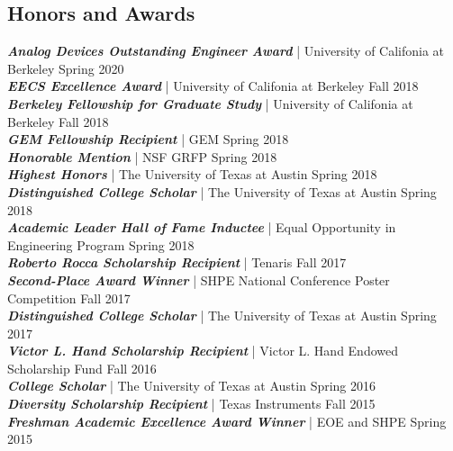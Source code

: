 \documentclass[letter]{res}
\begin{document}
\begin{resume}
\vspace{-6mm}

\section{Honors and Awards}
{\sl \textbf{Analog Devices Outstanding Engineer Award}} | University of Califonia at Berkeley \hfill Spring 2020\\
{\sl \textbf{EECS Excellence Award}} | University of Califonia at Berkeley \hfill Fall 2018\\
{\sl \textbf{Berkeley Fellowship for Graduate Study}} | University of Califonia at Berkeley \hfill Fall 2018\\
{\sl \textbf{GEM Fellowship Recipient}} | GEM \hfill Spring 2018\\
{\sl \textbf{Honorable Mention}} | NSF GRFP \hfill Spring 2018\\
{\sl \textbf{Highest Honors}} | The University of Texas at Austin  \hfill Spring 2018\\
{\sl \textbf{Distinguished College Scholar}} | The University of Texas at Austin  \hfill Spring 2018\\
{\sl \textbf{Academic Leader Hall of Fame Inductee}} | Equal Opportunity in Engineering Program  \hfill Spring 2018\\
{\sl \textbf{Roberto Rocca Scholarship Recipient}} | Tenaris \hfill Fall 2017\\
{\sl \textbf{Second-Place Award Winner}} | SHPE National Conference Poster Competition  \hfill Fall 2017\\
{\sl \textbf{Distinguished College Scholar}} | The University of Texas at Austin  \hfill Spring 2017\\
{\sl \textbf{Victor L. Hand Scholarship Recipient}} | Victor L. Hand Endowed Scholarship Fund \hfill Fall 2016\\
{\sl \textbf{College Scholar}} | The University of Texas at Austin \hfill Spring 2016\\
{\sl \textbf{Diversity Scholarship Recipient}} | Texas Instruments \hfill Fall 2015\\
{\sl \textbf{Freshman Academic Excellence Award Winner}} | EOE and SHPE \hfill Spring 2015\\

\end{resume}
\end{document}
